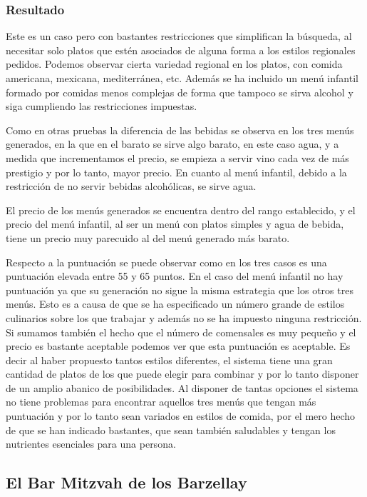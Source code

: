 \documentclass{article}
\begin{document}
\subsubsection{Resultado}
Este es un caso pero con bastantes restricciones que simplifican la búsqueda, al necesitar solo platos que estén asociados de alguna forma a los estilos regionales pedidos. Podemos observar cierta variedad regional en los platos, con comida americana, mexicana, mediterránea, etc. Además se ha incluido un menú infantil formado por comidas menos complejas de forma que tampoco se sirva alcohol y siga cumpliendo las restricciones impuestas.
\par
Como en otras pruebas la diferencia de las bebidas se observa en los tres menús generados, en la que en el barato se sirve algo barato, en este caso agua, y a medida que incrementamos el precio, se empieza a servir vino cada vez de más prestigio y por lo tanto, mayor precio. En cuanto al menú infantil, debido a la restricción de no servir bebidas alcohólicas, se sirve agua.
\par
El precio de los menús generados se encuentra dentro del rango establecido, y el precio del menú infantil, al ser un menú con platos simples y agua de bebida, tiene un precio muy parecuido al del menú generado más barato.
\par
Respecto a la puntuación se puede observar como en los tres casos es una puntuación elevada entre 55 y 65 puntos. En el caso del menú infantil no hay puntuación ya que su generación no sigue la misma estrategia que los otros tres menús. Esto es a causa de que se ha especificado un número grande de estilos culinarios sobre los que trabajar y además no se ha impuesto ninguna restricción. Si sumamos también el hecho que el número de comensales es muy pequeño y el precio es bastante aceptable podemos ver que esta puntuación es aceptable. Es decir al haber propuesto tantos estilos diferentes, el sistema tiene una gran cantidad de platos de los que puede elegir para combinar y por lo tanto disponer de un amplio abanico de posibilidades. Al disponer de tantas opciones el sistema no tiene problemas para encontrar aquellos tres menús que tengan más puntuación y por lo tanto sean variados en estilos de comida, por el mero hecho de que se han indicado bastantes, que sean también saludables y tengan los nutrientes esenciales para una persona.

\subsection{El Bar Mitzvah de los Barzellay}
\end{document}
